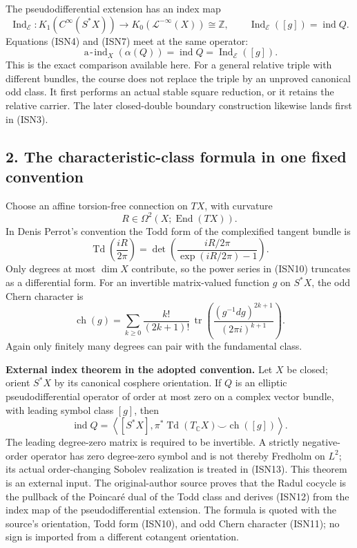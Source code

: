 \documentclass[
  11pt,
]{article}
\begin{document}
The pseudodifferential extension has an index map \[
 \operatorname{Ind}_{\mathcal E}:
 K_1(C^\infty(S^*X))
 \longrightarrow K_0(\mathcal L^{-\infty}(X))
 \cong\mathbb Z,
 \qquad
 \operatorname{Ind}_{\mathcal E}([g])=\operatorname{ind}Q.
 \tag{ISN7}
\] Equations (ISN4) and (ISN7) meet at the same operator: \[
 \operatorname{a\!-\!ind}_X(\alpha(Q))
 =\operatorname{ind}Q
 =\operatorname{Ind}_{\mathcal E}([g]).
 \tag{ISN8}
\] This is the exact comparison available here. For a general relative
triple with different bundles, the course does not replace the triple by
an unproved canonical odd class. It first performs an actual stable
square reduction, or it retains the relative carrier. The later
closed-double boundary construction likewise lands first in (ISN3).

\subsection{2. The characteristic-class formula in one fixed
convention}\label{the-characteristic-class-formula-in-one-fixed-convention}

Choose an affine torsion-free connection on \(TX\), with curvature \[
 R\in\Omega^2(X;\operatorname{End}(TX)).
 \tag{ISN9}
\] In Denis Perrot's convention the Todd form of the complexified
tangent bundle is \[
 \operatorname{Td}\!\left(\frac{iR}{2\pi}\right)
 =
 \det\!\left(
   \frac{iR/2\pi}{\exp(iR/2\pi)-1}
 \right).
 \tag{ISN10}
\] Only degrees at most \(\dim X\) contribute, so the power series in
(ISN10) truncates as a differential form. For an invertible
matrix-valued function \(g\) on \(S^*X\), the odd Chern character is \[
 \operatorname{ch}(g)
 =
 \sum_{k\geq0}
 \frac{k!}{(2k+1)!}\,
 \operatorname{tr}\!\left(
   \frac{(g^{-1}dg)^{2k+1}}{(2\pi i)^{k+1}}
 \right).
 \tag{ISN11}
\] Again only finitely many degrees can pair with the fundamental class.

\textbf{External index theorem in the adopted convention.} Let \(X\) be
closed; orient \(S^*X\) by its canonical cosphere orientation. If \(Q\)
is an elliptic pseudodifferential operator of order at most zero on a
complex vector bundle, with leading symbol class \([g]\), then \[
 \operatorname{ind}Q
 =
 \left\langle
   [S^*X],
   \pi^*\operatorname{Td}(T_{\mathbb C}X)
      \smile\operatorname{ch}([g])
 \right\rangle.
 \tag{ISN12}
\] The leading degree-zero matrix is required to be invertible. A
strictly negative-order operator has zero degree-zero symbol and is not
thereby Fredholm on \(L^2\); its actual order-changing Sobolev
realization is treated in (ISN13). This theorem is an external input.
The original-author source proves that the Radul cocycle is the pullback
of the Poincaré dual of the Todd class and derives (ISN12) from the
index map of the pseudodifferential extension. The formula is quoted
with the source's orientation, Todd form (ISN10), and odd Chern
character (ISN11); no sign is imported from a different cotangent
orientation.
\end{document}
